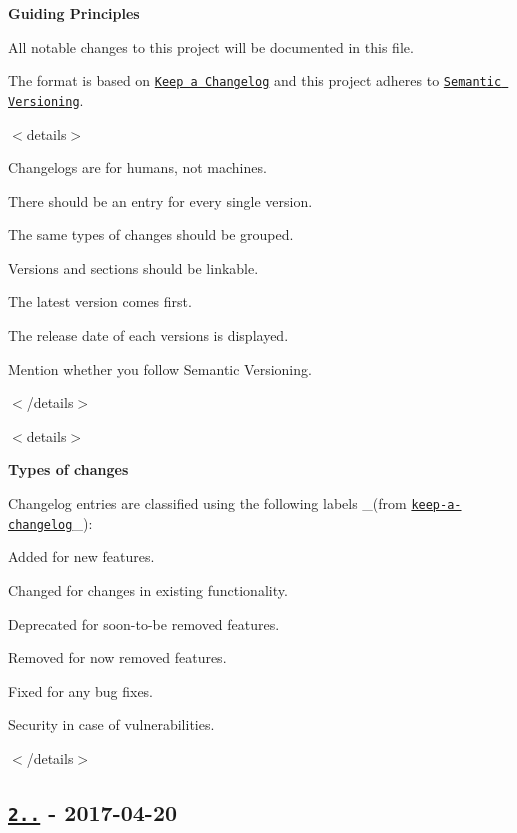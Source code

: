 {\bfseries Guiding Principles}

All notable changes to this project will be documented in this file.

The format is based on \href{http://keepachangelog.com/en/1.0.0/}{\tt Keep a Changelog} and this project adheres to \href{http://semver.org/spec/v2.0.0.html}{\tt Semantic Versioning}.

$<$details$>$


\begin{DoxyItemize}
\item Changelogs are for humans, not machines.
\item There should be an entry for every single version.
\item The same types of changes should be grouped.
\item Versions and sections should be linkable.
\item The latest version comes first.
\item The release date of each versions is displayed.
\item Mention whether you follow Semantic Versioning.
\end{DoxyItemize}

$<$/details$>$

$<$details$>$ 

{\bfseries Types of changes}

Changelog entries are classified using the following labels \+\_\+(from \href{http://keepachangelog.com/}{\tt keep-\/a-\/changelog}\+\_\+)\+:


\begin{DoxyItemize}
\item {\ttfamily Added} for new features.
\item {\ttfamily Changed} for changes in existing functionality.
\item {\ttfamily Deprecated} for soon-\/to-\/be removed features.
\item {\ttfamily Removed} for now removed features.
\item {\ttfamily Fixed} for any bug fixes.
\item {\ttfamily Security} in case of vulnerabilities.
\end{DoxyItemize}

$<$/details$>$

\subsection*{\href{https://github.com/jonschlinkert/define-property/compare/1.0.0...2.0.0}{\tt 2..} -\/ 2017-\/04-\/20}

